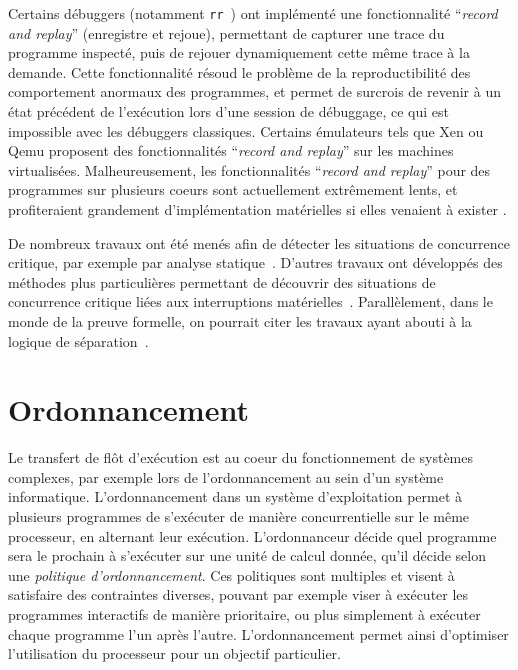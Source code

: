 Certains débuggers (notamment \texttt{rr}~\cite{mozRR}) ont implémenté une fonctionnalité ``\emph{record and replay}'' (enregistre et rejoue), permettant de capturer une trace du programme inspecté, puis de rejouer dynamiquement cette même trace à la demande. Cette fonctionnalité résoud le problème de la reproductibilité des comportement anormaux des programmes, et permet de surcrois de revenir à un état précédent de l'exécution lors d'une session de débuggage, ce qui est impossible avec les débuggers classiques. Certains émulateurs tels que Xen ou Qemu proposent des fonctionnalités ``\emph{record and replay}'' sur les machines virtualisées. Malheureusement, les fonctionnalités ``\emph{record and replay}'' pour des programmes sur plusieurs coeurs sont actuellement extrêmement lents, et profiteraient grandement d'implémentation matérielles si elles venaient à exister \cite{mozRR}.

De nombreux travaux ont été menés afin de détecter les situations de concurrence critique, par exemple par analyse statique~\cite{racerX}. D'autres travaux ont développés des méthodes plus particulières permettant de découvrir des situations de concurrence critique liées aux interruptions matérielles~\cite{sdracer}. Parallèlement, dans le monde de la preuve formelle, on pourrait citer les travaux ayant abouti à la logique de séparation~\cite{separationlogic}.


		\section{Ordonnancement}

		Le transfert de flôt d'exécution est au coeur du fonctionnement de systèmes complexes, par exemple lors de l'ordonnancement au sein d'un système informatique. L'ordonnancement dans un système d'exploitation permet à plusieurs programmes de s'exécuter de manière concurrentielle sur le même processeur, en alternant leur exécution. L'ordonnanceur décide quel programme sera le prochain à s'exécuter sur une unité de calcul donnée, qu'il décide selon une \emph{politique d'ordonnancement}. Ces politiques sont multiples et visent à satisfaire des contraintes diverses, pouvant par exemple viser à exécuter les programmes interactifs de manière prioritaire, ou plus simplement à exécuter chaque programme l'un après l'autre. L'ordonnancement permet ainsi d'optimiser l'utilisation du processeur pour un objectif particulier. 

